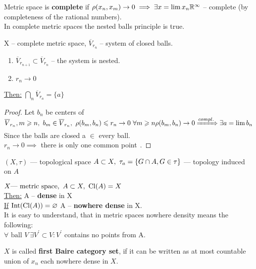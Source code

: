 \begin{defn}
  Metric space is \textbf{complete} if $\rho(x_n, x_m) \to 0 \implies \exists x = \lim x_n \\
  \mathbb{R}^\infty$ -- complete (by completeness of the rational numbers). \\
  In complete metric spaces the nested balls principle is true.
\end{defn}
\begin{thm}
  X -- complete metric space, $\overline{V}_{r_n}$ -- system of closed balls. \\
  \begin{enumerate}
      \item $\overline{V}_{r_{n + 1}} \subset \overline{V}_{r_n}$ -- the system is nested.
      \item $r_n \to 0$
    \end{enumerate}
  \underline{Then:} $\bigcap\limits_n \overline{V}_{r_n} = \{a\}$
\end{thm}
\begin{proof}
  Let $b_n$ be centers of $\overline{V}_{r_n}, \\
  m \geq n,\ b_m \in \overline{V}_{r_n},\ \rho(b_m, b_n) \leq r_n \to 0\ \forall m \geq n \\
  \rho(b_m, b_n) \to 0 \xRightarrow{compl.} \exists a = \lim b_n$
  Since the balls are closed a $\in$ every ball. \\
  $r_n \to 0 \implies$ there is only one common point $\qedhere$.
\end{proof}
\noindent
$(X, \tau)$ --- topological space
$\\A \subset X,\ \tau_a = \{G \cap A, G \in \tau\}$ --- topology induced on $A$
\begin{defn}
  $X \textnormal{--- metric space},\ A \subset X,\ \operatorname{Cl}({A}) = X$ \\
  \underline{Then:} A -- \textbf{dense} in X \\
  \underline{If} $\operatorname{Int}({\operatorname{Cl}({A})}) = \varnothing$ A -- \textbf{nowhere dense} in X. \\
  It is easy to understand, that in metric spaces nowhere density means the following: \\
  $\forall \text{ ball } V\ \exists V^{'} \subset V\colon V^{'}$ contains no points from A.
\end{defn}
\begin{defn}
  $X$ is called \textbf{first Baire category set}, if it can be written as at most
  countable union of $x_n$ each nowhere dense in $X$.
\end{defn}
